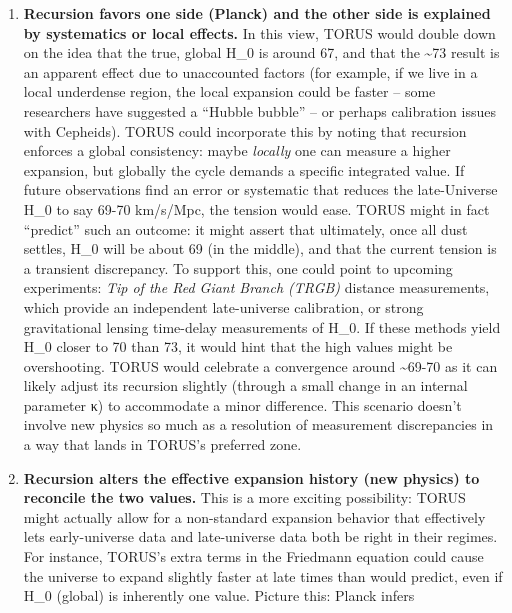 \documentclass[
]{article}
\begin{document}
{\begin{enumerate}
\def\labelenumi{\arabic{enumi}.}
\item
  \textbf{Recursion favors one side (Planck) and the other side is
  explained by systematics or local effects.} In this view, TORUS would
  double down on the idea that the true, global
  H_{0}{} is around 67,
  and that the \textasciitilde73 result is an apparent effect due to
  unaccounted factors (for example, if we live in a local underdense
  region, the local expansion could be faster -- some researchers have
  suggested a ``Hubble bubble'' -- or perhaps calibration issues with
  Cepheids). TORUS could incorporate this by noting that recursion
  enforces a global consistency: maybe \emph{locally} one can measure a
  higher expansion, but globally the cycle demands a specific integrated
  value. If future observations find an error or systematic that reduces
  the late-Universe
  H_{0}{} to say 69-70
  km/s/Mpc, the tension would ease. TORUS might in fact ``predict'' such
  an outcome: it might assert that ultimately, once all dust settles,
  H_{0}{} will be about
  69 (in the middle)\hspace{0pt}, and that the current tension is a
  transient discrepancy. To support this, one could point to upcoming
  experiments: \emph{Tip of the Red Giant Branch (TRGB)} distance
  measurements, which provide an independent late-universe calibration,
  or strong gravitational lensing time-delay measurements of
  H_{0}. If these methods
  yield H_{0}{} closer to
  70 than 73, it would hint that the high values might be overshooting.
  TORUS would celebrate a convergence around \textasciitilde69-70 as it
  can likely adjust its recursion slightly (through a small change in an
  internal parameter κ) to accommodate a minor difference\hspace{0pt}.
  This scenario doesn't involve new physics so much as a resolution of
  measurement discrepancies in a way that lands in TORUS's preferred
  zone.
\item
  \textbf{Recursion alters the effective expansion history (new physics)
  to reconcile the two values.} This is a more exciting possibility:
  TORUS might actually allow for a non-standard expansion behavior that
  effectively lets early-universe data and late-universe data both be
  right in their regimes. For instance, TORUS's extra terms in the
  Friedmann equation could cause the universe to expand slightly faster
  at late times than \LambdaCDM would predict, even if
  H_{0}{} (global) is
  inherently one value. Picture this: Planck infers

\end{enumerate}}
\end{document}
